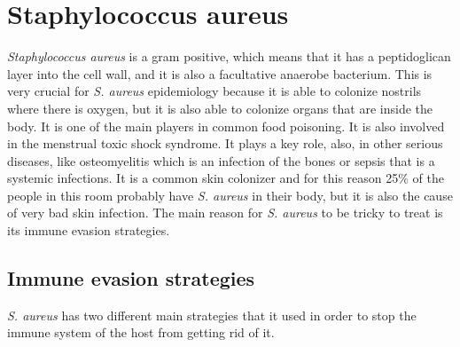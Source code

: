 \graphicspath{{chapters/images/09/}}

\chapter{Staphylococcus aureus}

\emph{Staphylococcus aureus} is a gram positive, which means that it has a peptidoglican layer into the cell wall, and it is also a facultative anaerobe bacterium. This is very crucial for \emph{S. aureus} epidemiology because it is able to colonize nostrils where there is oxygen, but it is also able to colonize organs that are inside the body. It is  one of the main players in common food poisoning. It is also involved in the menstrual toxic shock syndrome. It plays a key role, also, in other serious diseases, like osteomyelitis which is an infection of the bones or sepsis that is a systemic infections. 
It is a common skin colonizer and for this reason 25$\%$ of the people in this room probably have \emph{S. aureus} in their body, but it is also the cause of very bad skin infection. 
The main reason for \emph{S. aureus} to be tricky to treat is its immune evasion strategies.

\section{Immune evasion strategies}

\emph{S. aureus} has two different main strategies that it used in order to stop the immune system of the host from getting rid of it. 

